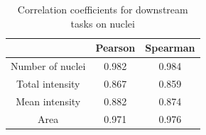 \begin{table}[htb]
    \centering
    \caption{Correlation coefficients for downstream tasks on nuclei}
        \begin{adjustbox}{width=0.4\textwidth}
            \begin{tabular}{|c|c|c|}\hline
                &Pearson&Spearman
                \\\hline\hline
                Number of nuclei&0.982&0.984\\\hline
                Total intensity&0.867&0.859\\\hline
                Mean intensity&0.882&0.874\\\hline
                Area&0.971&0.976\\\hline
            \end{tabular}
        \label{table:nuclei-downstream-metrics-coefficients}
        \end{adjustbox}
\end{table}
